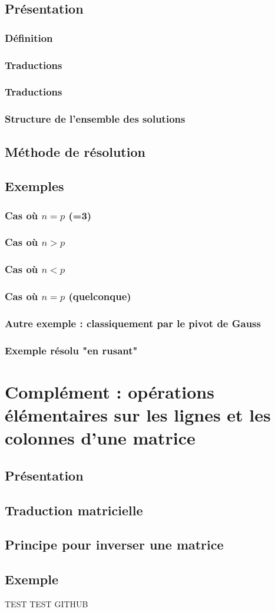 \documentclass[12pt,a4paper,french]{book}
\begin{document}
	\section{Présentation}
		\subsection{Définition}
		\subsection{Traductions}
		\subsection{Traductions}
		\subsection{Structure de l'ensemble des solutions}
	\section{Méthode de résolution}
	\section{Exemples}
		\subsection{Cas où $n=p$ (=3)}
		\subsection{Cas où $n>p$}
		\subsection{Cas où $n<p$}
		\subsection{Cas où $n=p$ (quelconque)}
		\subsection{Autre exemple : classiquement par le pivot de Gauss}
		\subsection{Exemple résolu "en rusant"}
		
\chapter{Complément : opérations élémentaires sur les lignes et les colonnes d'une matrice}
	\section{Présentation}
	\section{Traduction matricielle}
	\section{Principe pour inverser une matrice}
	\section{Exemple}
		TEST TEST GITHUB

	
	
\end{document}
